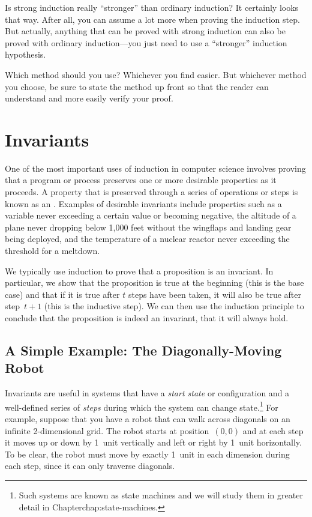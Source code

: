 Is strong induction really ``stronger'' than ordinary induction?  It
certainly looks that way.  After all, you can assume a lot more when
proving the induction step.  But actually, anything that can be proved
with strong induction can also be proved with ordinary induction---you
just need to use a ``stronger'' induction hypothesis.

Which method should you use?  Whichever you find easier.  But
whichever method you choose, be sure to state the method up front so
that the reader can understand and more easily verify your proof.

\section{Invariants}

One of the most important uses of induction in computer science
involves proving that a program or process preserves one or more
desirable properties as it proceeds.  A property that is preserved
through a series of operations or steps is known as an
.  Examples of desirable invariants include properties
such as a variable never exceeding a certain value or becoming
negative, the altitude of a plane never dropping below 1,000 feet
without the wingflaps and landing gear being deployed, and the
temperature of a nuclear reactor never exceeding the threshold for a
meltdown.

We typically use induction to prove that a proposition is an
invariant.  In particular, we show that the proposition is true at the
beginning (this is the base case) and that if it is true after $t$
steps have been taken, it will also be true after step~$t + 1$ (this
is the inductive step).  We can then use the induction principle to
conclude that the proposition is indeed an invariant, \ie that it will
always hold.

\subsection{A Simple Example: The Diagonally-Moving Robot}

Invariants are useful in systems that have a \emph{start state} or
configuration and a well-defined series of \emph{steps} during which
the system can change state.\footnote{Such systems are known as state
  machines and we will study them in greater detail in
  Chapter{chap:state-machines}.}  For example, suppose that you have a
robot that can walk across diagonals on an infinite 2-dimensional
grid.  The robot starts at position~$(0, 0)$ and at each step it moves
up or down by 1~unit vertically and left or right by 1~unit
horizontally.  To be clear, the robot must move by exactly 1~unit in
each dimension during each step, since it can only traverse diagonals.

